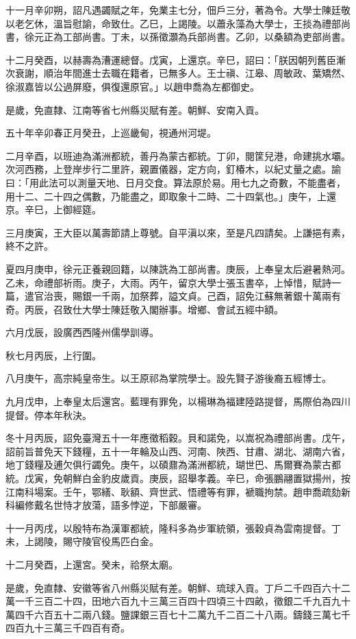 \begin{pinyinscope}
十一月辛卯朔，詔凡遇蠲賦之年，免業主七分，佃戶三分，著為令。大學士陳廷敬以老乞休，溫旨慰諭，命致仕。乙巳，上謁陵。以蕭永藻為大學士，王掞為禮部尚書，徐元正為工部尚書。丁未，以孫徵灝為兵部尚書。乙卯，以桑額為吏部尚書。

十二月癸酉，以赫壽為漕運總督。戊寅，上還京。辛巳，詔曰：「朕因朝列舊臣漸次衰謝，順治年間進士去職在籍者，已無多人。王士禛、江皋、周敏政、葉矯然、徐淑嘉皆以公過屏廢，俱復還原官。」以趙申喬為左都御史。

是歲，免直隸、江南等省七州縣災賦有差。朝鮮、安南入貢。

五十年辛卯春正月癸丑，上巡畿甸，視通州河堤。

二月辛酉，以班迪為滿洲都統，善丹為蒙古都統。丁卯，閱筐兒港，命建挑水壩。次河西務，上登岸步行二里許，親置儀器，定方向，釘椿木，以紀丈量之處。諭曰：「用此法可以測量天地、日月交食。算法原於易。用七九之奇數，不能盡者，用十二、二十四之偶數，乃能盡之，即取象十二時、二十四氣也。」庚午，上還京。辛巳，上御經筵。

三月庚寅，王大臣以萬壽節請上尊號。自平滇以來，至是凡四請矣。上謙挹有素，終不之許。

夏四月庚申，徐元正養親回籍，以陳詵為工部尚書。庚辰，上奉皇太后避暑熱河。乙未，命禮部祈雨。庚子，大雨。丙午，留京大學士張玉書卒，上悼惜，賦詩一篇，遣官治喪，賜銀一千兩，加祭葬，謚文貞。己酉，詔免江蘇無著銀十萬兩有奇。丙辰，召致仕大學士陳廷敬入閣辦事。增鄉、會試五經中額。

六月戊辰，設廣西西隆州儒學訓導。

秋七月丙辰，上行圍。

八月庚午，高宗純皇帝生。以王原祁為掌院學士。設先賢子游後裔五經博士。

九月戊申，上奉皇太后還宮。藍理有罪免，以楊琳為福建陸路提督，馬際伯為四川提督。停本年秋決。

冬十月丙辰，詔免臺灣五十一年應徵稻穀。貝和諾免，以嵩祝為禮部尚書。戊午，詔前旨普免天下錢糧，五十一年輪及山西、河南、陜西、甘肅、湖北、湖南六省，地丁錢糧及逋欠俱行蠲免。庚午，以碩鼐為滿洲都統，瑚世巴、馬爾賽為蒙古都統。戊寅，免朝鮮白金豹皮歲貢。庚辰，詔舉孝義。辛巳，命張鵬翮置獄揚州，按江南科場案。壬午，鄂繕、耿額、齊世武、悟禮等有罪，褫職拘禁。趙申喬疏劾新科編修戴名世恃才放蕩，語多悖逆，下部嚴審。

十一月丙戌，以殷特布為漢軍都統，隆科多為步軍統領，張穀貞為雲南提督。丁未，上謁陵，賜守陵官役馬匹白金。

十二月癸酉，上還宮。癸未，祫祭太廟。

是歲，免直隸、安徽等省八州縣災賦有差。朝鮮、琉球入貢。丁戶二千四百六十二萬一千三百二十四，田地六百九十三萬三百四十四頃三十四畝，徵銀二千九百九十萬四千六百五十二兩八錢。鹽課銀三百七十二萬九千二百二十八兩。鑄錢三萬七千四百九十三萬三千四百有奇。


\end{pinyinscope}
